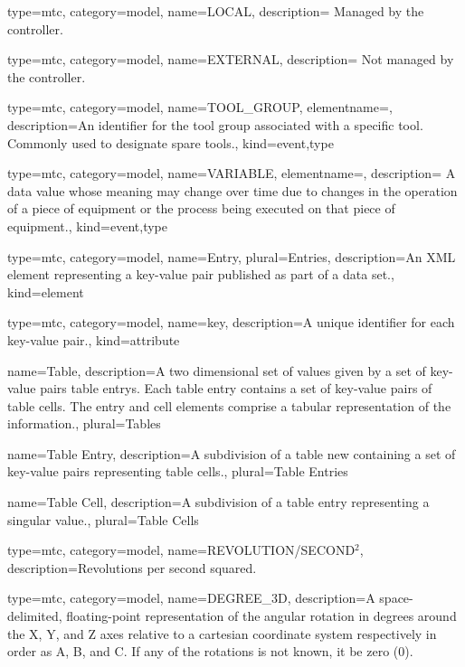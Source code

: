 {
  type=mtc,
  category=model,
  name={LOCAL},
  description={ Managed by the controller.}
}


{
  type=mtc,
  category=model,
  name={EXTERNAL},
  description={ Not managed by the controller.}
}


{
  type=mtc,
  category=model,
  name={TOOL\_GROUP},
  elementname=,
  description={An identifier for the tool group associated with a specific tool. Commonly used to designate spare tools.},
  kind={event,type}
}


{
  type=mtc,
  category=model,
  name={VARIABLE},
  elementname=,
  description={ A data value whose meaning may change over time due to changes in the operation of a piece of equipment or the process being executed on that piece of equipment.},
  kind={event,type}
}


{
  type=mtc,
  category=model,
  name={Entry},
  plural={Entries},
  description={An XML element representing a \gls{key-value pair} published as part of a \gls{data set}.},
  kind={element}
}

{
  type=mtc,
  category=model,
  name={key},
  description={A unique identifier for each \gls{key-value pair}.},
  kind={attribute}
}

{
  name={Table},
  description={A two dimensional set of values given by a set of \glspl{key-value pair} \glspl{table entry}. Each \gls{table entry} contains a set of \glspl{key-value pair} of \glspl{table cell}. The \gls{entry} and \gls{cell} elements comprise a tabular representation of the information.},
  plural={Tables}
}


{
  name={Table Entry},
  description={A subdivision of a \gls{table new} containing a set of \glspl{key-value pair} representing \glspl{table cell}.},
  plural={Table Entries}
}


{
  name={Table Cell},
  description={A subdivision of a \gls{table entry} representing a singular value.},
  plural={Table Cells}
}


{
  type=mtc,
  category=model,
  name={REVOLUTION/SECOND$^2$},
  description={Revolutions per second squared.}
}


{
  type=mtc,
  category=model,
  name={DEGREE\_3D},
  description={A space-delimited, floating-point representation of the angular rotation in degrees around the X, Y, and Z axes relative to a cartesian coordinate system respectively in order as A, B, and C. If any of the rotations is not known, it \MUST be zero (0).}
}


